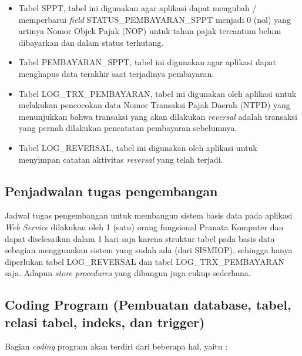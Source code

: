 \documentclass[pdftex,12pt, oneside]{article}
\begin{document}
\begin{enumerate}[1.]
	\begin{itemize}
		\item Tabel SPPT, tabel ini digunakan agar aplikasi dapat mengubah / memperbarui \textit{field} STATUS\_PEMBAYARAN\_SPPT menjadi 0 (nol) yang artinya Nomor Objek Pajak (NOP) untuk tahun pajak tercantum belum dibayarkan dan dalam status terhutang.
		\item Tabel PEMBAYARAN\_SPPT, tabel ini digunakan agar aplikasi dapat menghapus data terakhir saat terjadinya pembayaran.
		\item Tabel LOG\_TRX\_PEMBAYARAN, tabel ini digunakan oleh aplikasi untuk melakukan pencocokan data Nomor Transaksi Pajak Daerah (NTPD) yang menunjukkan bahwa transaksi yang akan dilakukan \textit{reversal} adalah transaksi yang pernah dilakukan pencatatan pembayaran sebelumnya.
		\item Tabel LOG\_REVERSAL, tabel ini digunakan oleh aplikasi untuk menyimpan catatan aktivitas \textit{reversal} yang telah terjadi.
	\end{itemize}
\end{enumerate}

\subsection{Penjadwalan tugas pengembangan}

Jadwal tugas pengembangan untuk membangun sistem basis data pada aplikasi \textit{Web Service} dilakukan oleh 1 (satu) orang fungsional Pranata Komputer dan dapat diselesaikan dalam 1 hari saja karena struktur tabel pada basis data sebagian menggunakan sistem yang sudah ada (dari SISMIOP), sehingga hanya diperlukan tabel LOG\_REVERSAL dan tabel LOG\_TRX\_PEMBAYARAN saja. Adapun \textit{store procedures} yang dibangun juga cukup sederhana.

\subsection{Coding Program (Pembuatan database, tabel, relasi tabel, indeks, dan trigger)}

Bagian \textit{coding} program akan terdiri dari beberapa hal, yaitu :
\end{document}

